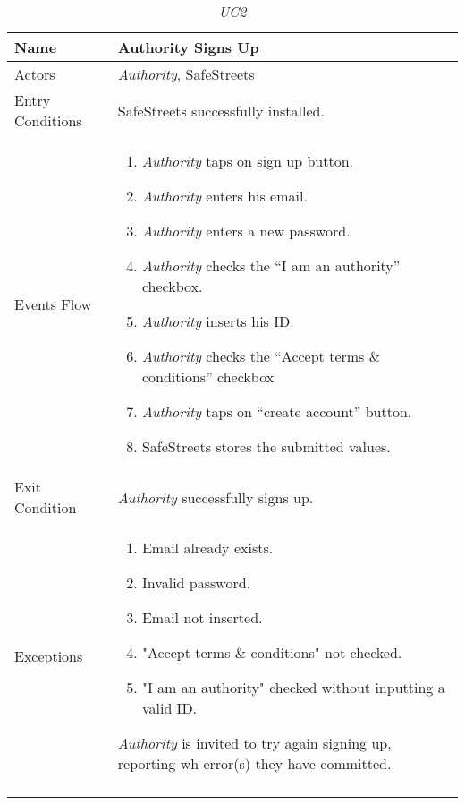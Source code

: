 \documentclass[../../../RASD.tex]{subfiles}
\begin{document}
    \begin{center}
        \begin{longtable}{| p{.35\linewidth} | p{.65\linewidth} |}

            \hline
            \textbf{Name} & \textbf{Authority Signs Up}\\ \hline
            Actors & \textit{Authority}, SafeStreets\\ \hline
            Entry Conditions & SafeStreets successfully installed.\\ \hline
            Events Flow &
            \begin{enumerate}
                \item \textit{Authority} taps on sign up button.
                \item \textit{Authority} enters his email.
                \item \textit{Authority} enters a new password.
                \item \textit{Authority} checks the “I am an authority” checkbox.
                \item \textit{Authority} inserts his ID.
                \item \textit{Authority} checks the “Accept terms \& conditions” checkbox
                \item \textit{Authority} taps on “create account” button.
                \item SafeStreets stores the submitted values.
            \end{enumerate}
            \\ \hline
            Exit Condition & \textit{Authority} successfully signs up.\\ \hline
            Exceptions &
            \begin{enumerate}
                \item Email already exists.
                \item Invalid password.
                \item Email not inserted.
                \item "Accept terms \& conditions" not checked.
                \item "I am an authority" checked without inputting a valid ID.
            \end{enumerate}
            \textit{Authority} is invited to try again signing up, reporting wh error(s) they have committed. \\
            \hline
            \caption[\textit{Use Case 2}]{\textit{UC2}}
        \end{longtable}
    \end{center}
\end{document}
